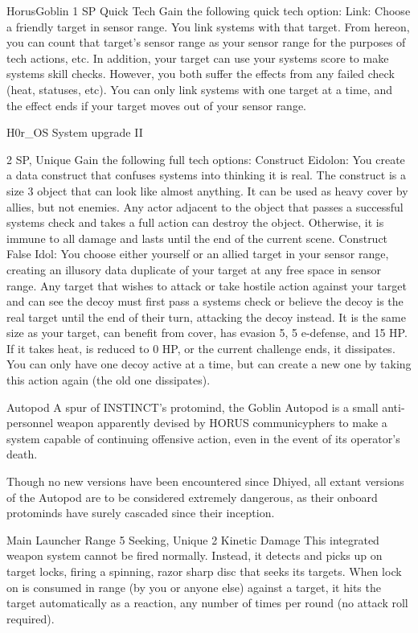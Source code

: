 \begin{mech}{Horus}{Goblin}
1 SP
Quick Tech
Gain the following quick tech option:
Link: Choose a friendly target in sensor range. You link systems with that target. From hereon, you can count that target’s sensor range as your sensor range for the purposes of tech actions, etc. In addition, your target can use your systems score to make systems skill checks. However, you both suffer the effects from any failed check (heat, statuses, etc). You can only link systems with one target at a time, and the effect ends if your target moves out of your sensor range.

H0r\_OS System upgrade II

2 SP, Unique
Gain the following full tech options:
Construct Eidolon: You create a data construct that confuses systems into thinking it is real. The construct is a size 3 object that can look like almost anything. It can be used as heavy cover by allies, but not enemies. Any actor adjacent to the object that passes a successful systems check and takes a full action can destroy the object. Otherwise, it is immune to all damage and lasts until the end of the current scene.
Construct False Idol: You choose either yourself or an allied target in your sensor range, creating an illusory data duplicate of your target at any free space in sensor range. Any target that wishes to attack or take hostile action against your target and can see the decoy must first pass a systems check or believe the decoy is the real target until the end of their turn, attacking the decoy instead. It is the same size as your target, can benefit from cover, has evasion 5, 5 e-defense, and 15 HP. If it takes heat, is reduced to 0 HP, or the current challenge ends, it dissipates. You can only have one decoy active at a time, but can create a new one by taking this action again (the old one dissipates).

Autopod
A spur of INSTINCT’s protomind, the Goblin Autopod is a small anti-personnel weapon apparently devised by HORUS communicyphers to make a system capable of continuing offensive action, even in the event of its operator’s death.

Though no new versions have been encountered since Dhiyed, all extant versions of the Autopod are to be considered extremely dangerous, as their onboard protominds have surely cascaded since their inception.

Main Launcher
Range 5
Seeking, Unique
2 Kinetic Damage
This integrated weapon system cannot be fired normally. Instead, it detects and picks up on target locks, firing a spinning, razor sharp disc that seeks its targets. When lock on is consumed in range (by you or anyone else) against a target, it hits the target automatically as a reaction, any number of times per round (no attack roll required).


\end{mech}
